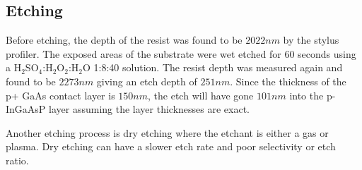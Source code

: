 \subsection{Etching}
\label{sec:fab:etching}


Before etching, the depth of the resist was found to be $2022nm$ by the stylus profiler. The exposed areas of the substrate were wet etched for 60 seconds using a H$_{2}$SO$_{4}$:H$_{2}$O$_{2}$:H$_{2}$O 1:8:40 solution. The resist depth was measured again and found to be $2273nm$ giving an etch depth of $251nm$. Since the thickness of the p+ GaAs contact layer is $150nm$, the etch will have gone $101nm$ into the p-InGaAsP layer assuming the layer thicknesses are exact.

Another etching process is dry etching where the etchant is either a gas or plasma. Dry etching can have a slower etch rate and poor selectivity or etch ratio.
